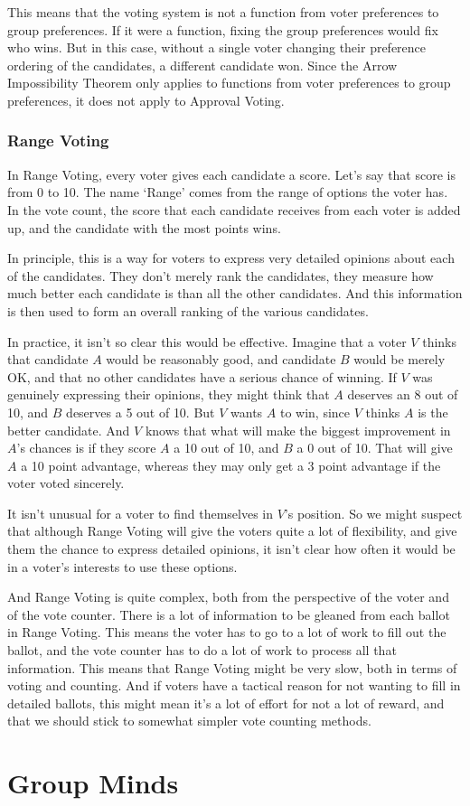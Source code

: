 \documentclass[openany]{book}
\begin{document}
This means that the voting system is not a function from voter preferences to group preferences. If it were a function, fixing the group preferences would fix who wins. But in this case, without a single voter changing their preference ordering of the candidates, a different candidate won. Since the Arrow Impossibility Theorem only applies to functions from voter preferences to group preferences, it does not apply to Approval Voting.

\section{Range Voting}
In Range Voting, every voter gives each candidate a score. Let's say that score is from 0 to 10. The name `Range' comes from the range of options the voter has. In the vote count, the score that each candidate receives from each voter is added up, and the candidate with the most points wins.

In principle, this is a way for voters to express very detailed opinions about each of the candidates. They don't merely rank the candidates, they measure how much better each candidate is than all the other candidates. And this information is then used to form an overall ranking of the various candidates.

In practice, it isn't so clear this would be effective. Imagine that a voter $V$ thinks that candidate $A$ would be reasonably good, and candidate $B$ would be merely OK, and that no other candidates have a serious chance of winning. If $V$ was genuinely expressing their opinions, they might think that $A$ deserves an 8 out of 10, and $B$ deserves a 5 out of 10. But $V$ wants $A$ to win, since $V$ thinks $A$ is the better candidate. And $V$ knows that what will make the biggest improvement in $A$'s chances is if they score $A$ a 10 out of 10, and $B$ a 0 out of 10. That will give $A$ a 10 point advantage, whereas they may only get a 3 point advantage if the voter voted sincerely.

It isn't unusual for a voter to find themselves in $V$'s position. So we might suspect that although Range Voting will give the voters quite a lot of flexibility, and give them the chance to express detailed opinions, it isn't clear how often it would be in a voter's interests to use these options.

And Range Voting is quite complex, both from the perspective of the voter and of the vote counter. There is a lot of information to be gleaned from each ballot in Range Voting. This means the voter has to go to a lot of work to fill out the ballot, and the vote counter has to do a lot of work to process all that information. This means that Range Voting might be very slow, both in terms of voting and counting. And if voters have a tactical reason for not wanting to fill in detailed ballots, this might mean it's a lot of effort for not a lot of reward, and that we should stick to somewhat simpler vote counting methods.

\part{Group Minds}
\end{document}
